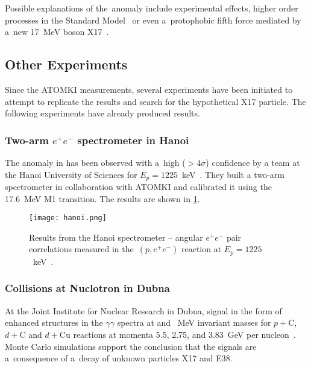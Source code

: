 				Possible explanations of the~anomaly include experimental effects, higher order processes in the Standard Model~\cite{kalman,aleksejevs} or even a~protophobic fifth force mediated by a~new 17~MeV boson X17~\cite{feng}.
		\subsection{Other Experiments}
			Since the ATOMKI measurements, several experiments have been initiated to attempt to replicate the results and search for the hypothetical X17 particle. The following experiments have already produced results.
			
			\subsubsection{Two-arm $e^+e^-$ spectrometer in Hanoi}
				The anomaly in  has been observed with a~high ($>4\sigma$) confidence by a team at the Hanoi University of Sciences for $E_p = 1225$~keV~\cite{hanoi}. They built a two\nobreakdash-arm spectrometer in collaboration with ATOMKI and calibrated it using the 17.6~MeV M1 transition. The results are shown in \cref{fig:hanoi}.
				
				\begin{figure}
					\centering
					\texttt{[image: hanoi.png]}
					\caption{Results from the Hanoi spectrometer -- angular $e^+e^-$ pair correlations measured in the~$(p,e^+e^-)$ reaction at $E_p = 1225$~keV~\cite{hanoi}.}
					\label{fig:hanoi}
				\end{figure}
			
			\subsubsection{Collisions at Nuclotron in Dubna}
				At the Joint Institute for Nuclear Research in Dubna, signal in the form of enhanced structures in the $\gamma\gamma$ spectra at  and ~MeV invariant masses for $p+\mathrm{C}$, $d+\mathrm{C}$ and $d+\mathrm{Cu}$ reactions at momenta 5.5, 2.75, and 3.83~GeV per nucleon~\cite{dubna}. Monte Carlo simulations support the conclusion that the signals are a~consequence of a~decay of unknown particles X17 and E38.
				
